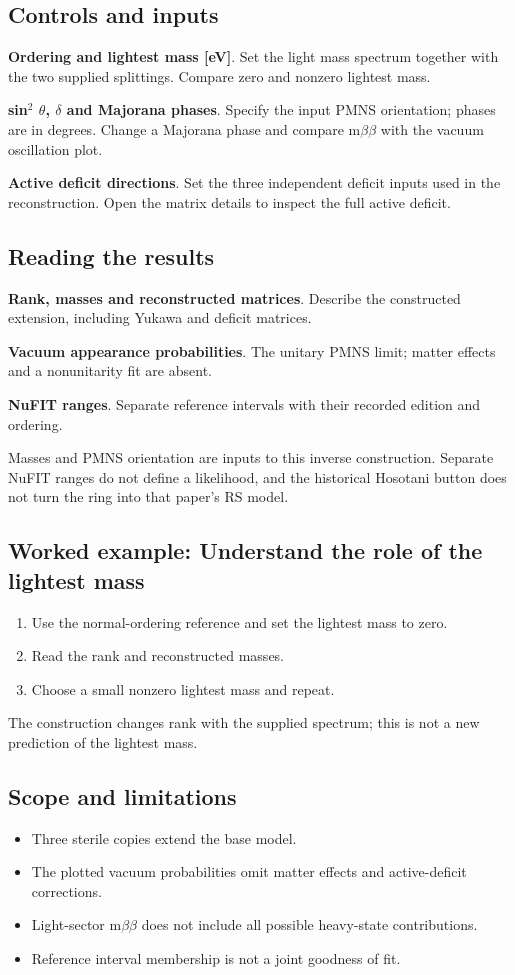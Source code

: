 \documentclass[11pt,a4paper]{article}
\begin{document}
\subsection*{Controls and inputs}
\textbf{Ordering and lightest mass [eV]}. Set the light mass spectrum together with the two supplied splittings. Compare zero and nonzero lightest mass.

\textbf{sin\ensuremath{{}^{2}} \ensuremath{\theta}, \ensuremath{\delta} and Majorana phases}. Specify the input PMNS orientation; phases are in degrees. Change a Majorana phase and compare m\ensuremath{\beta}\ensuremath{\beta} with the vacuum oscillation plot.

\textbf{Active deficit directions}. Set the three independent deficit inputs used in the reconstruction. Open the matrix details to inspect the full active deficit.

\subsection*{Reading the results}
\textbf{Rank, masses and reconstructed matrices}. Describe the constructed extension, including Yukawa and deficit matrices.

\textbf{Vacuum appearance probabilities}. The unitary PMNS limit; matter effects and a nonunitarity fit are absent.

\textbf{NuFIT ranges}. Separate reference intervals with their recorded edition and ordering.

Masses and PMNS orientation are inputs to this inverse construction. Separate NuFIT ranges do not define a likelihood, and the historical Hosotani button does not turn the ring into that paper's RS model.
\subsection*{Worked example: Understand the role of the lightest mass}
\begin{enumerate}
\item Use the normal-ordering reference and set the lightest mass to zero.
\item Read the rank and reconstructed masses.
\item Choose a small nonzero lightest mass and repeat.
\end{enumerate}
The construction changes rank with the supplied spectrum; this is not a new prediction of the lightest mass.
\subsection*{Scope and limitations}
\begin{itemize}
\item Three sterile copies extend the base model.
\item The plotted vacuum probabilities omit matter effects and active-deficit corrections.
\item Light-sector m\ensuremath{\beta}\ensuremath{\beta} does not include all possible heavy-state contributions.
\item Reference interval membership is not a joint goodness of fit.
\end{itemize}
\end{document}
